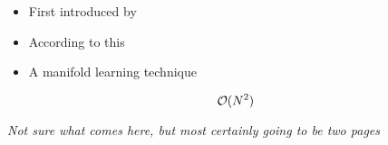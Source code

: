\begin{itemize}
	\item First introduced by \cite{roweis2000nonlinear}
	\item According to this \cite{DRUnsupervisedNearestNeighbors}
	\item A manifold learning technique \cite{HandsOnMLCh8}
\end{itemize}

$$\mathcal{O}(N^2)$$

\clearpage

\begin{center}
	\textit{Not sure what comes here, but most certainly going to be two pages}
\end{center}
